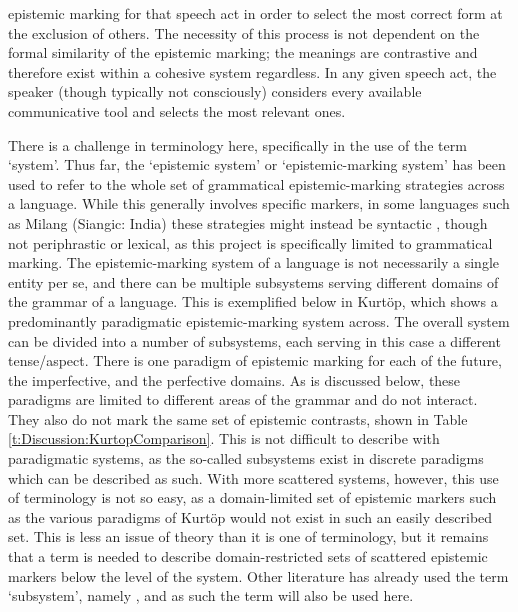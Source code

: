 epistemic marking for that speech act in order to select the most correct form at the exclusion of others. The necessity of this process is not dependent on the formal similarity of the epistemic marking; the meanings are contrastive and therefore exist within a cohesive system regardless. In any given speech act, the speaker (though typically not consciously) considers every available communicative tool and selects the most relevant ones. 

There is a challenge in terminology here, specifically in the use of the term `system'. Thus far, the `epistemic system' or `epistemic-marking system' has been used to refer to the whole set of grammatical epistemic-marking strategies across a language. While this generally involves specific markers, in some languages such as Milang (Siangic: India) these strategies might instead be syntactic \cite{Modi2017}, though not periphrastic or lexical, as this project is specifically limited to grammatical marking. The epistemic-marking system of a language is not necessarily a single entity per se, and there can be multiple subsystems serving different domains of the grammar of a language. This is exemplified below in Kurtöp, which shows a predominantly paradigmatic epistemic-marking system across. The overall system can be divided into a number of subsystems, each serving in this case a different tense/aspect. There is one paradigm of epistemic marking for each of the future, the imperfective, and the perfective domains. As is discussed below, these paradigms are limited to different areas of the grammar and do not interact. They also do not mark the same set of epistemic contrasts, shown in Table \ref{t:Discussion:KurtopComparison}. This is not difficult to describe with paradigmatic systems, as the so-called subsystems exist in discrete paradigms which can be described as such. With more scattered systems, however, this use of terminology is not so easy, as a domain-limited set of epistemic markers such as the various paradigms of Kurtöp would not exist in such an easily described set. This is less an issue of theory than it is one of terminology, but it remains that a term is needed to describe domain-restricted sets of scattered epistemic markers below the level of the system. Other literature has already used the term `subsystem', namely , and as such the term will also be used here.

